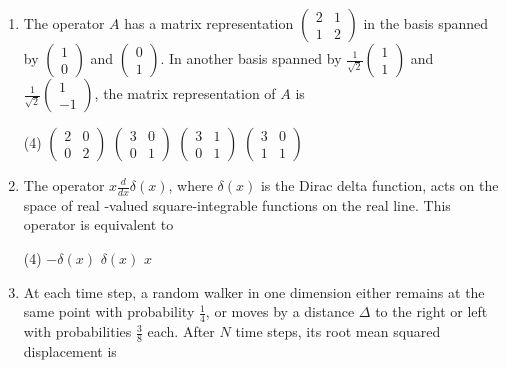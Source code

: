 \begin{enumerate}
\item The operator $A$ has a matrix representation $\left(\begin{array}{ll}2 & 1 \\ 1 & 2\end{array}\right)$ in the basis spanned by $\left(\begin{array}{l}1 \\ 0\end{array}\right)$ and $\left(\begin{array}{l}0 \\ 1\end{array}\right)$. In another basis spanned by $\frac{1}{\sqrt{2}}\left(\begin{array}{l}1 \\ 1\end{array}\right)$ and $\frac{1}{\sqrt{2}}\left(\begin{array}{c}1 \\ -1\end{array}\right)$, the matrix representation of $A$ is
 \begin{tasks}(4)
	\task[\textbf{a.}]$\left(\begin{array}{ll}2 & 0 \\ 0 & 2\end{array}\right)$
	\task[\textbf{b.}]$\left(\begin{array}{ll}3 & 0 \\ 0 & 1\end{array}\right)$
	\task[\textbf{c.}]$\left(\begin{array}{ll}3 & 1 \\ 0 & 1\end{array}\right)$
	\task[\textbf{d.}] $\left(\begin{array}{ll}3 & 0 \\ 1 & 1\end{array}\right)$
\end{tasks}
\item The operator $x \frac{d}{d x} \delta(x)$, where $\delta(x)$ is the Dirac delta function, acts on the space of real -valued square-integrable functions on the real line. This operator is equivalent to
 \begin{tasks}(4)
	\task[\textbf{a.}]$-\delta(x)$
	\task[\textbf{b.}]$\delta(x)$
	\task[\textbf{c.}]$x$
\end{tasks}
\item At each time step, a random walker in one dimension either remains at the same point with probability $\frac{1}{4}$, or moves by a distance $\Delta$ to the right or left with probabilities $\frac{3}{8}$ each. After $N$ time steps, its root mean squared displacement is

\end{enumerate}
